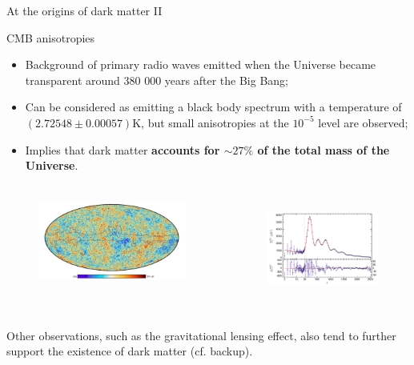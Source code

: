 \documentclass[8pt]{beamer}
\begin{document}
\begin{frame}{At the origins of dark matter II}
\justifying

\vspace{5pt}
\begin{block}{ \centering CMB anisotropies}\end{block}

\begin{itemize}
\justifying
\item Background of primary radio waves emitted when the Universe became transparent around 380 000 years after the Big Bang;
\item Can be considered as emitting a black body spectrum with a temperature of $(2.72548\pm 0.00057)$K, but small anisotropies at the $10^{-5}$ level are observed;%
\item Implies that dark matter \textbf{accounts for $\sim 27\%$ of the total mass of the Universe}.
\end{itemize} \vfill

\begin{columns}
	\begin{column}{0.54\textwidth}
\begin{figure}[htbp]
\begin{center}
\includegraphics[width=6.5cm, height=3cm]{figs/PlanckTemperature.png}
\end{center}
\end{figure}
\end{column}
\begin{column}{0.44\textwidth}
\begin{figure}[htbp]
\begin{center}
\includegraphics[width=5cm, height=3.5cm]{figs/PlanckSpectrum.png}
\end{center}
\end{figure}
\end{column}
\end{columns} \vfill

Other observations, such as the gravitational lensing effect, \alert{also tend to further support the existence of dark matter} (cf. backup). \vfill
\end{frame}
\end{document}
